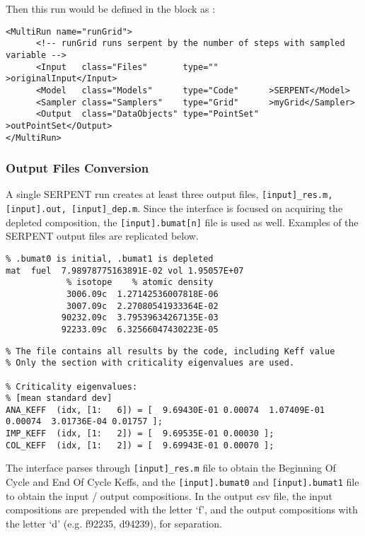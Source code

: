 Then this run would be defined in the  block as :
\begin{lstlisting}[style=XML]
<MultiRun name="runGrid">
      <!-- runGrid runs serpent by the number of steps with sampled variable -->
      <Input   class="Files"       type=""          >originalInput</Input>
      <Model   class="Models"      type="Code"      >SERPENT</Model>
      <Sampler class="Samplers"    type="Grid"      >myGrid</Sampler>
      <Output  class="DataObjects" type="PointSet"  >outPointSet</Output>
</MultiRun>
\end{lstlisting}

\subsubsection{Output Files Conversion}
A single SERPENT run creates at least three output files,
\texttt{[input]\_res.m, [input].out, [input]\_dep.m}.
Since the interface is
focused on acquiring the depleted composition, the \texttt{[input].bumat[n]}
file is used as well. Examples of the SERPENT output files are replicated below.

\begin{lstlisting}[language={}]
% bumat file
% .bumat0 is initial, .bumat1 is depleted
mat  fuel  7.98978775163891E-02 vol 1.95057E+07
            % isotope    % atomic density
            3006.09c  1.27142536007818E-06
            3007.09c  2.27080541933364E-02
           90232.09c  3.79539634267135E-03
           92233.09c  6.32566047430223E-05
\end{lstlisting}

\begin{lstlisting}[language={}]
% _res.m file
% The file contains all results by the code, including Keff value
% Only the section with criticality eigenvalues are used.

% Criticality eigenvalues:
% [mean standard dev]
ANA_KEFF  (idx, [1:   6]) = [  9.69430E-01 0.00074  1.07409E-01 0.00074  3.01736E-04 0.01757 ];
IMP_KEFF  (idx, [1:   2]) = [  9.69535E-01 0.00030 ];
COL_KEFF  (idx, [1:   2]) = [  9.69943E-01 0.00070 ];
\end{lstlisting}


The interface parses through \texttt{[input]\_res.m} file
to obtain the Beginning Of Cycle and End Of Cycle Keffs, and the 
\texttt{[input].bumat0} and \texttt{[input].bumat1} file to obtain the
input / output compositions. In the output csv file, the input compositions
are prepended with the letter `f', and the output compositions with the letter `d'
(e.g. f92235, d94239), for separation. 

